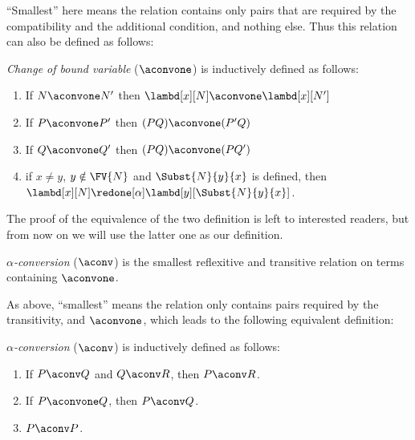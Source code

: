 \documentclass[../../../include/open-logic-section]{subfiles}
\begin{document}
``Smallest'' here means the relation contains only pairs that are required by
the compatibility and the additional condition, and nothing else. Thus
this relation can also be defined as follows:
\begin{defn} 
  \emph{Change of bound variable} ($\aconvone$) is inductively
  defined as follows:
  \begin{enumerate}
  \item If $N \aconvone N'$ then $\lambd[x][N] \aconvone
    \lambd[x][N']$ 
  \item If $P \aconvone P'$ then $(PQ) \aconvone (P'Q)$ 
  \item If $Q \aconvone Q'$ then $(PQ) \aconvone (PQ')$ 
  \item if $x \neq y$, $y \notin \FV{N}$ and $\Subst{N}{y}{x}$ is defined, then
    $\lambd[x][N] \redone[\alpha] \lambd[y][\Subst{N}{y}{x}]$.
    
  \end{enumerate}
\end{defn}

The proof of the equivalence of the two definition is left to
interested readers, but from now on we will use the latter one as our
definition.

\begin{defn}
  \emph{$\alpha$-conversion} ($\aconv$) is the smallest reflexitive
  and transitive relation on terms containing $\aconvone$.
\end{defn}

As above, ``smallest'' means the relation only contains pairs required
by the transitivity, and $\aconvone$, which leads to the following
equivalent definition:

\begin{defn} 
  \emph{$\alpha$-conversion} ($\aconv$) is inductively defined as follows:
  \begin{enumerate}
  \item If $P \aconv Q$ and $Q \aconv R$, then $P \aconv R$.
  \item If $P \aconvone Q$, then $P \aconv Q$. 
  \item $P \aconv P$. 
  \end{enumerate}
\end{defn}
\end{document}
